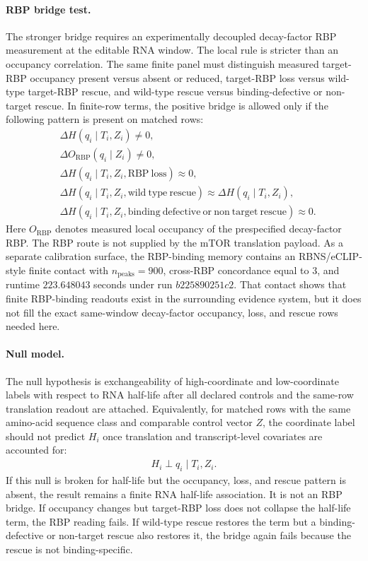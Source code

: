 \paragraph{RBP bridge test.}
The stronger bridge requires an experimentally decoupled decay-factor RBP measurement at the editable RNA window.  The local rule is stricter than an occupancy correlation.  The same finite panel must distinguish measured target-RBP occupancy present versus absent or reduced, target-RBP loss versus wild-type target-RBP rescue, and wild-type rescue versus binding-defective or non-target rescue.  In finite-row terms, the positive bridge is allowed only if the following pattern is present on matched rows:
$$
\begin{aligned}
&\Delta H(q_i \mid T_i,Z_i) \neq 0,\\
&\Delta O_{\mathrm{RBP}}(q_i \mid Z_i) \neq 0,\\
&\Delta H(q_i \mid T_i,Z_i,\mathrm{RBP\ loss}) \approx 0,\\
&\Delta H(q_i \mid T_i,Z_i,\mathrm{wild\ type\ rescue}) \approx \Delta H(q_i \mid T_i,Z_i),\\
&\Delta H(q_i \mid T_i,Z_i,\mathrm{binding\ defective\ or\ non\ target\ rescue}) \approx 0.
\end{aligned}
$$
Here $O_{\mathrm{RBP}}$ denotes measured local occupancy of the prespecified decay-factor RBP.  The RBP route is not supplied by the mTOR translation payload.  As a separate calibration surface, the RBP-binding memory contains an RBNS/eCLIP-style finite contact with $n_{\mathrm{peaks}}=900$, cross-RBP concordance equal to $3$, and runtime $223.648043$ seconds under run $b225890251c2$.  That contact shows that finite RBP-binding readouts exist in the surrounding evidence system, but it does not fill the exact same-window decay-factor occupancy, loss, and rescue rows needed here.

\paragraph{Null model.}
The null hypothesis is exchangeability of high-coordinate and low-coordinate labels with respect to RNA half-life after all declared controls and the same-row translation readout are attached.  Equivalently, for matched rows with the same amino-acid sequence class and comparable control vector $Z$, the coordinate label should not predict $H_i$ once translation and transcript-level covariates are accounted for:
$$
\begin{aligned}
H_i \perp q_i \mid T_i,Z_i.
\end{aligned}
$$
If this null is broken for half-life but the occupancy, loss, and rescue pattern is absent, the result remains a finite RNA half-life association.  It is not an RBP bridge.  If occupancy changes but target-RBP loss does not collapse the half-life term, the RBP reading fails.  If wild-type rescue restores the term but a binding-defective or non-target rescue also restores it, the bridge again fails because the rescue is not binding-specific.

